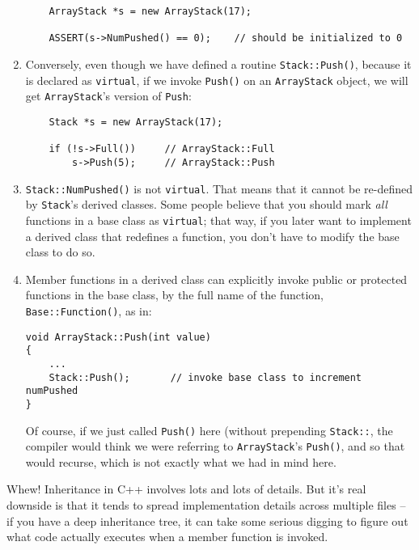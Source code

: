 \begin{enumerate}
\begin{verbatim}
    ArrayStack *s = new ArrayStack(17);

    ASSERT(s->NumPushed() == 0);	// should be initialized to 0
\end{verbatim}

\item Conversely, even though we have defined a routine {\tt Stack::Push()},
because it is declared as {\tt virtual}, if we invoke {\tt Push()}
on an {\tt ArrayStack} object, we will get {\tt ArrayStack}'s version
of {\tt Push}:

\begin{verbatim}
    Stack *s = new ArrayStack(17);

    if (!s->Full())		// ArrayStack::Full
        s->Push(5);		// ArrayStack::Push
\end{verbatim}

\item {\tt Stack::NumPushed()} is not {\tt virtual}.  That means
that it cannot be re-defined by {\tt Stack}'s derived classes.
Some people believe that you should mark {\em all} functions
in a base class as {\tt virtual}; that way, if you later want to
implement a derived class that redefines a function, you don't have
to modify the base class to do so.

\item Member functions in a derived class can explicitly invoke
public or protected functions in the base class, by the full
name of the function, {\tt Base::Function()}, as in:

\begin{verbatim}
void ArrayStack::Push(int value)
{
    ...
    Stack::Push();	     // invoke base class to increment numPushed
}
\end{verbatim}

Of course, if we just called {\tt Push()} here (without prepending
{\tt Stack::}, the compiler would think we were referring
to {\tt ArrayStack}'s {\tt Push()}, and so that would recurse,
which is not exactly what we had in mind here.

\end{enumerate}

Whew!  Inheritance in C++ involves lots and lots of details.
But it's real downside is that it tends to spread implementation
details across multiple files -- if you have a deep inheritance
tree, it can take some serious digging to figure out what code
actually executes when a member function is invoked.

